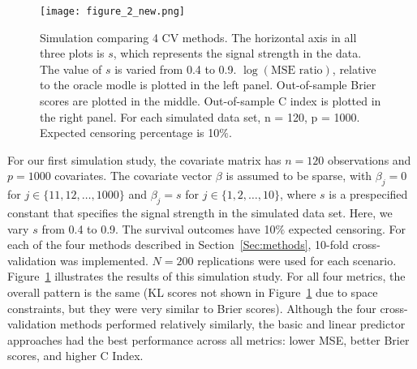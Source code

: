 \begin{figure}[ht]
  \centering
  \texttt{[image: figure\_2\_new.png]}
  \caption{\label{Fig:mse-brier-c} Simulation comparing 4 CV methods. The horizontal axis in all three plots is $s$, which represents the signal strength in the data. The value of $s$ is varied from 0.4 to 0.9.  $\log(\text{MSE ratio})$, relative to the oracle modle is plotted in the left panel. Out-of-sample Brier scores are plotted in the middle. Out-of-sample C index is plotted in the right panel. For each simulated data set, n = 120, p = 1000. Expected censoring percentage is 10$\%$.}
\end{figure}	

For our first simulation study, the covariate matrix has $n = 120$ observations and $p = 1000$ covariates. The covariate vector $\beta$ is assumed to be sparse, with $\beta_j = 0$ for $j \in \{11, 12, \ldots, 1000\}$ and $\beta_j = s$ for $j \in \{1, 2, \ldots, 10 \}$, where $s$ is a prespecified constant that specifies the signal strength in the simulated data set. Here, we vary $s$ from 0.4 to 0.9. The survival outcomes have 10$\%$ expected censoring. For each of the four methods described in Section~\ref{Sec:methods}, 10-fold cross-validation was implemented. $N = 200$ replications were used for each scenario.  Figure~\ref{Fig:mse-brier-c} illustrates the results of this simulation study. For all four metrics, the overall pattern is the same (KL scores not shown in Figure~\ref{Fig:mse-brier-c} due to space constraints, but they were very similar to Brier scores).  Although the four cross-validation methods performed relatively similarly, the basic and linear predictor approaches had the best performance across all metrics: lower MSE, better Brier scores, and higher C Index.

